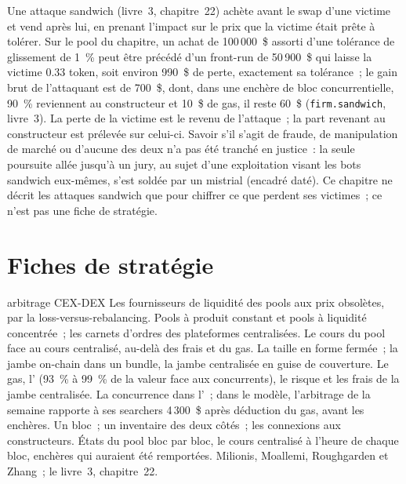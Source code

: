 Une attaque sandwich (livre~3, chapitre~22) achète avant le swap d'une victime et vend après lui, en prenant l'impact sur le prix que la victime était prête à
tolérer. Sur le pool du chapitre, un achat de 100\,000~\$ assorti d'une tolérance de glissement de 1~\% peut être précédé d'un front-run de 50\,900~\$ qui laisse la victime
0.33 token, soit environ 990~\$ de perte, exactement sa tolérance~; le gain brut de l'attaquant est de 700~\$, dont, dans une enchère de bloc concurrentielle, 90~\% reviennent
au constructeur et 10~\$ de gas, il reste 60~\$ (\texttt{firm.sandwich}, livre~3). La perte de la victime est le revenu de l'attaque~; la part revenant au constructeur est
prélevée sur celui-ci. Savoir s'il s'agit de fraude, de manipulation de marché ou d'aucune des deux n'a pas été tranché en justice~: la seule poursuite allée jusqu'à un jury, au sujet
d'une exploitation visant les bots sandwich eux-mêmes, s'est soldée par un mistrial (encadré daté). Ce chapitre ne décrit les attaques sandwich que pour chiffrer ce que
perdent ses victimes~; ce n'est pas une fiche de stratégie.

\section{Fiches de stratégie}

\begin{strategyfile}{arbitrage CEX-DEX}\label{strat:hf:on-chain-trading:cexdex}
 Les fournisseurs de liquidité des pools aux prix obsolètes, par la loss-versus-rebalancing.
 Pools à produit constant et pools à liquidité concentrée~; les carnets d'ordres des plateformes centralisées.
 Le cours du pool face au cours centralisé, au-delà des frais et du gas.
 La taille en forme fermée~; la jambe on-chain dans un bundle, la jambe centralisée en guise de couverture.
 Le gas, l' (93~\% à 99~\% de la valeur face aux concurrents), le risque et les frais de la jambe centralisée.
 La concurrence dans l'~; dans le modèle, l'arbitrage de la semaine rapporte à ses searchers 4\,300~\$ après déduction du gas, avant les enchères.
 Un bloc~; un inventaire des deux côtés~; les connexions aux constructeurs.
 États du pool bloc par bloc, le cours centralisé à l'heure de chaque bloc, enchères qui auraient été remportées.
 Milionis, Moallemi, Roughgarden et Zhang~; le livre~3, chapitre~22.
\end{strategyfile}

